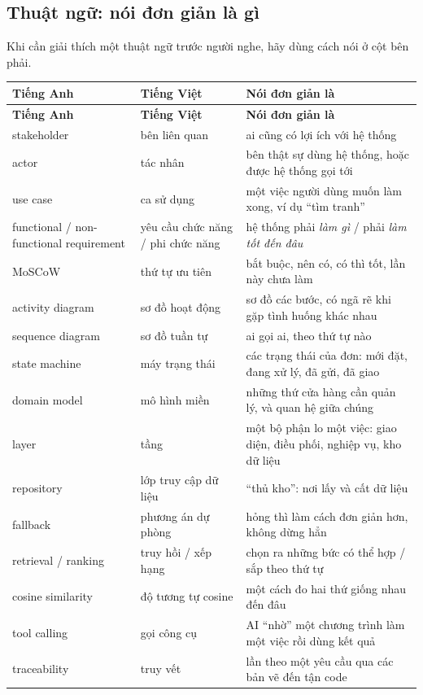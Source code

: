 \subsection{Thuật ngữ: nói đơn giản là gì}
Khi cần giải thích một thuật ngữ trước người nghe, hãy dùng cách nói ở cột bên phải.
\begin{center}\small
\begin{longtable}{@{}P{3.7cm}P{3.5cm}P{8.6cm}@{}}
\toprule
\textbf{Tiếng Anh} & \textbf{Tiếng Việt} & \textbf{Nói đơn giản là}\\
\midrule\endfirsthead
\toprule
\textbf{Tiếng Anh} & \textbf{Tiếng Việt} & \textbf{Nói đơn giản là}\\
\midrule\endhead
stakeholder & bên liên quan & ai cũng có lợi ích với hệ thống\\
actor & tác nhân & bên thật sự dùng hệ thống, hoặc được hệ thống gọi tới\\
use case & ca sử dụng & một việc người dùng muốn làm xong, ví dụ ``tìm tranh''\\
functional / non-functional requirement & yêu cầu chức năng / phi chức năng & hệ thống phải \emph{làm gì} / phải \emph{làm tốt đến đâu}\\
MoSCoW & thứ tự ưu tiên & bắt buộc, nên có, có thì tốt, lần này chưa làm\\
activity diagram & sơ đồ hoạt động & sơ đồ các bước, có ngã rẽ khi gặp tình huống khác nhau\\
sequence diagram & sơ đồ tuần tự & ai gọi ai, theo thứ tự nào\\
state machine & máy trạng thái & các trạng thái của đơn: mới đặt, đang xử lý, đã gửi, đã giao\\
domain model & mô hình miền & những thứ cửa hàng cần quản lý, và quan hệ giữa chúng\\
layer & tầng & một bộ phận lo một việc: giao diện, điều phối, nghiệp vụ, kho dữ liệu\\
repository & lớp truy cập dữ liệu & ``thủ kho'': nơi lấy và cất dữ liệu\\
fallback & phương án dự phòng & hỏng thì làm cách đơn giản hơn, không dừng hẳn\\
retrieval / ranking & truy hồi / xếp hạng & chọn ra những bức có thể hợp / sắp theo thứ tự\\
cosine similarity & độ tương tự cosine & một cách đo hai thứ giống nhau đến đâu\\
tool calling & gọi công cụ & AI ``nhờ'' một chương trình làm một việc rồi dùng kết quả\\
traceability & truy vết & lần theo một yêu cầu qua các bản vẽ đến tận code\\
\bottomrule
\end{longtable}
\end{center}

